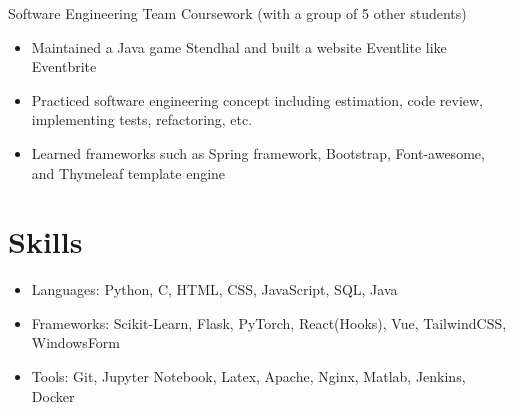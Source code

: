 \documentclass{resume}
\begin{document}
Software Engineering Team Coursework (with a group of 5 other students)
\begin{itemize}
    \item Maintained a Java game Stendhal and built a website Eventlite like Eventbrite
    \item Practiced software engineering concept including estimation, code review, implementing tests, refactoring, etc.
    \item Learned frameworks such as Spring framework, Bootstrap, Font-awesome, and Thymeleaf template engine 
\end{itemize}

\section{Skills}
\begin{itemize}
    \item Languages: Python, C, HTML, CSS, JavaScript, SQL, Java
    \item Frameworks: Scikit-Learn, Flask, PyTorch, React(Hooks), Vue, TailwindCSS, WindowsForm
    \item Tools: Git, Jupyter Notebook, Latex, Apache, Nginx, Matlab, Jenkins, Docker
\end{itemize}
\end{document}
